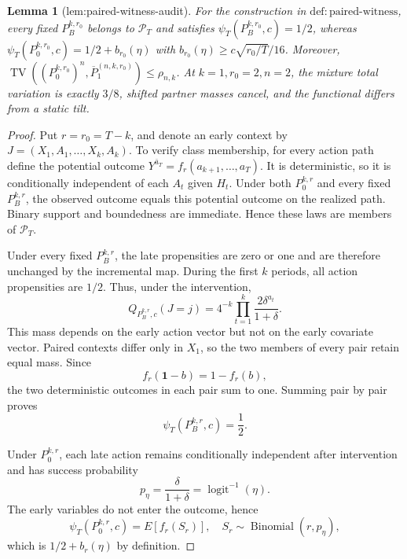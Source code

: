 \documentclass{article}
\newtheorem{lemma}{Lemma}
\begin{document}
\begin{lemma}[lem:paired-witness-audit]\label{lem:paired-witness-audit}
For the construction in \(\mathrm{def:paired\text{-}witness}\), every fixed \(P_B^{k,r_0}\) belongs to \(\mathcal P_T\) and satisfies \(\psi_T(P_B^{k,r_0},c)=1/2\), whereas \(\psi_T(P_0^{k,r_0},c)=1/2+b_{r_0}(\eta)\) with \(b_{r_0}(\eta)\geq c\sqrt{r_0/T}/16\). Moreover, \(\operatorname{TV}((P_0^{k,r_0})^n,\overline P_1^{(n,k,r_0)})\leq\rho_{n,k}\). At \(k=1,r_0=2,n=2\), the mixture total variation is exactly \(3/8\), shifted partner masses cancel, and the functional differs from a static tilt.
\end{lemma}
\begin{proof}
Put \(r=r_0=T-k\), and denote an early context by \(J=(X_1,A_1,\ldots,X_k,A_k)\).  To verify class membership, for every action path define the potential outcome \(Y^{\bar a_T}=f_r(a_{k+1},\ldots,a_T)\).  It is deterministic, so it is conditionally independent of each \(A_t\) given \(H_t\).  Under both \(P_0^{k,r}\) and every fixed \(P_B^{k,r}\), the observed outcome equals this potential outcome on the realized path.  Binary support and boundedness are immediate.  Hence these laws are members of \(\mathcal P_T\).

Under every fixed \(P_B^{k,r}\), the late propensities are zero or one and are therefore unchanged by the incremental map.  During the first \(k\) periods, all action propensities are \(1/2\).  Thus, under the intervention,
\[
 Q_{P_B^{k,r},c}(J=j)
 =4^{-k}\prod_{t=1}^k\frac{2\delta^{a_t}}{1+\delta}.
\]
This mass depends on the early action vector but not on the early covariate vector.  Paired contexts differ only in \(X_1\), so the two members of every pair retain equal mass.  Since
\[
 f_r(\mathbf 1-b)=1-f_r(b),
\]
the two deterministic outcomes in each pair sum to one.  Summing pair by pair proves
\[
 \psi_T(P_B^{k,r},c)=\frac12.
\]

Under \(P_0^{k,r}\), each late action remains conditionally independent after intervention and has success probability
\[
 p_\eta=\frac{\delta}{1+\delta}=\operatorname{logit}^{-1}(\eta).
\]
The early variables do not enter the outcome, hence
\[
 \psi_T(P_0^{k,r},c)
 =E[f_r(S_r)],\quad S_r\sim\operatorname{Binomial}(r,p_\eta),
\]
which is \(1/2+b_r(\eta)\) by definition.


\end{proof}
\end{document}
